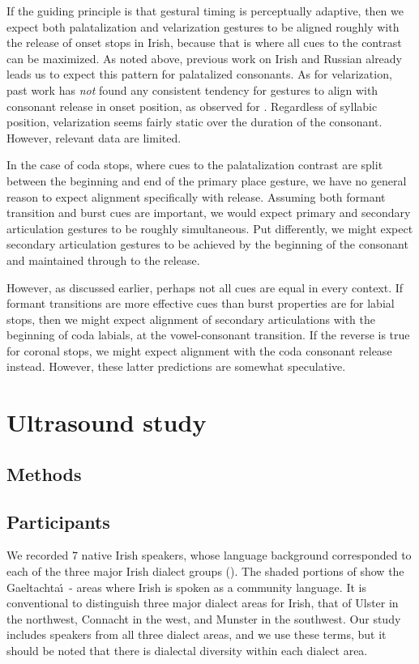 \documentclass[output=paper,colorlinks,citecolor=brown]{langscibook}
\begin{document}
If the guiding principle is that gestural timing is perceptually adaptive, then we expect both palatalization and velarization gestures to be aligned roughly with the release of onset stops in Irish, because that is where all cues to the contrast can be maximized. As noted above, previous work on Irish and Russian already leads us to expect this pattern for palatalized consonants. As for velarization, past work has \emph{not} found any consistent tendency for  gestures to align with consonant release in onset position, as observed for . Regardless of syllabic position, velarization seems fairly static over the duration of the consonant. However, relevant data are limited.

In the case of coda stops, where cues to the palatalization contrast are split between the beginning and end of the primary place gesture, we have no general reason to expect alignment specifically with release. Assuming both formant transition and burst cues are important, we would expect primary and secondary articulation gestures to be roughly simultaneous. Put differently, we might expect secondary articulation gestures to be achieved by the beginning of the consonant and maintained through to the release. 

However, as discussed earlier, perhaps not all cues are equal in every context. If formant transitions are more effective cues than burst properties are for labial stops, then we might expect alignment of secondary articulations with the beginning of coda labials, at the vowel-consonant transition. If the reverse is true for coronal stops, we might expect alignment with the coda consonant release instead. However, these latter predictions are somewhat speculative.

\section{Ultrasound study}

\subsection{Methods}
\subsection{Participants}
We recorded 7 native Irish speakers, whose language background corresponded to each of the three major Irish dialect groups (). The shaded portions of  show the Gaeltachta\'{\i}~- areas where Irish is spoken as a community language. It is conventional to distinguish three major dialect areas for Irish, that of Ulster in the northwest, Connacht in the west, and Munster in the southwest. Our study includes speakers from all three dialect areas, and we use these terms, but it should be noted that there is dialectal diversity within each dialect area.
\end{document}
